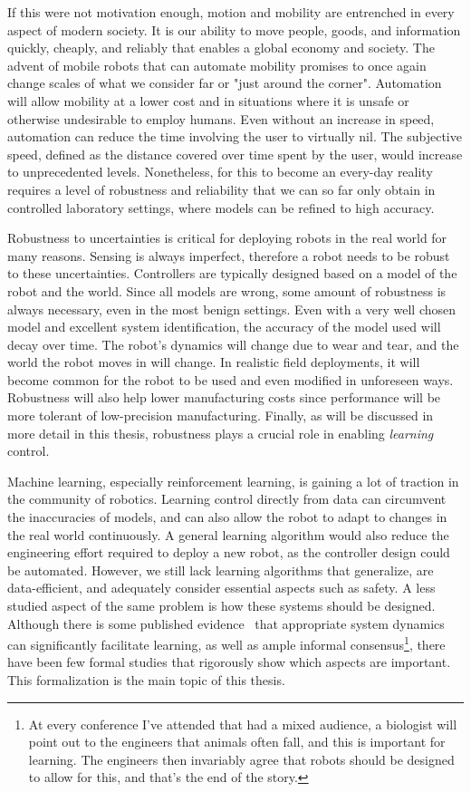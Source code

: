 If this were not motivation enough, motion and mobility are entrenched in every aspect of modern society. It is our ability to move people, goods, and information quickly, cheaply, and reliably that enables a global economy and society. The advent of mobile robots that can automate mobility promises to once again change scales of what we consider far or "just around the corner". Automation will allow mobility at a lower cost and in situations where it is unsafe or otherwise undesirable to employ humans. Even without an increase in speed, automation can reduce the time involving the user to virtually nil. The subjective speed, defined as the distance covered over time spent by the user, would increase to unprecedented levels. Nonetheless, for this to become an every-day reality requires a level of robustness and reliability that we can so far only obtain in controlled laboratory settings, where models can be refined to high accuracy. \par

Robustness to uncertainties is critical for deploying robots in the real world for many reasons.
Sensing is always imperfect, therefore a robot needs to be robust to these uncertainties.
Controllers are typically designed based on a model of the robot and the world. Since all models are wrong, some amount of robustness is always necessary, even in the most benign settings.
Even with a very well chosen model and excellent system identification, the accuracy of the model used will decay over time.
The robot's dynamics will change due to wear and tear, and the world the robot moves in will change.
In realistic field deployments, it will become common for the robot to be used and even modified in unforeseen ways.
Robustness will also help lower manufacturing costs since performance will be more tolerant of low-precision manufacturing.
Finally, as will be discussed in more detail in this thesis, robustness plays a crucial role in enabling \emph{learning} control.
\par
Machine learning, especially reinforcement learning, is gaining a lot of traction in the community of robotics. Learning control directly from data can circumvent the inaccuracies of models, and can also allow the robot to adapt to changes in the real world continuously.
A general learning algorithm would also reduce the engineering effort required to deploy a new robot, as the controller design could be automated.
However, we still lack learning algorithms that generalize, are data-efficient, and adequately consider essential aspects such as safety.
A less studied aspect of the same problem is how these systems should be designed. Although there is some published evidence~\cite{tedrake2005learning, randlov2000shaping} that appropriate system dynamics can significantly facilitate learning, as well as ample informal consensus\footnote{At every conference I've attended that had a mixed audience, a biologist will point out to the engineers that animals often fall, and this is important for learning. The engineers then invariably agree that robots should be designed to allow for this, and that's the end of the story.}, there have been few formal studies that rigorously show which aspects are important. This formalization is the main topic of this thesis.


